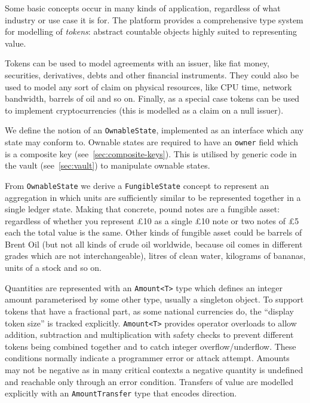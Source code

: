 \documentclass{article}
\begin{document}
Some basic concepts occur in many kinds of application, regardless of what industry or use case it is for. The
platform provides a comprehensive type system for modelling of \emph{tokens}: abstract countable objects highly
suited to representing value.

Tokens can be used to model agreements with an issuer, like fiat money, securities, derivatives, debts and
other financial instruments. They could also  be used to model any sort of claim on physical resources,
like CPU time, network bandwidth, barrels of oil and so on. Finally, as a special case tokens can be used to
implement cryptocurrencies (this is modelled as a claim on a null issuer).

We define the notion of an \texttt{OwnableState}, implemented as an interface which any state may conform to.
Ownable states are required to have an \texttt{owner} field which is a composite key
(see~\cref{sec:composite-keys}). This is utilised by generic code in the vault (see~\cref{sec:vault}) to manipulate
ownable states.

From \texttt{OwnableState} we derive a \texttt{FungibleState} concept to represent an aggregation in which units
are sufficiently similar to be represented together in a single ledger state. Making that concrete, pound notes are
a fungible asset: regardless of whether you represent \pounds10 as a single \pounds10 note or two notes of \pounds5
each the total value is the same. Other kinds of fungible asset could be barrels of Brent Oil (but not all kinds of
crude oil worldwide, because oil comes in different grades which are not interchangeable), litres of clean water,
kilograms of bananas, units of a stock and so on.

Quantities are represented with an \texttt{Amount<T>} type which defines an integer amount parameterised by some
other type, usually a singleton object. To support tokens that have a fractional part, as some national currencies
do, the ``display token size'' is tracked explicitly. \texttt{Amount<T>} provides operator overloads to allow
addition, subtraction and multiplication with safety checks to prevent different tokens being combined together and
to catch integer overflow/underflow. These conditions normally indicate a programmer error or attack attempt.
Amounts may not be negative as in many critical contexts a negative quantity is undefined and reachable only
through an error condition. Transfers of value are modelled explicitly with an \texttt{AmountTransfer} type that
encodes direction.
\end{document}
